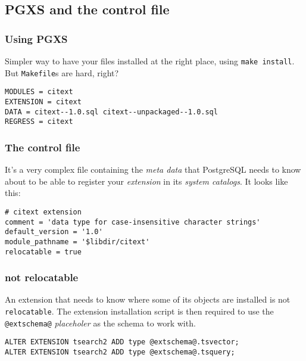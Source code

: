 \documentclass[english]{beamer}
\begin{document}
\subsection{PGXS and the control file}

\begin{frame}[fragile]
  \frametitle{Using PGXS}

  Simpler way to have your files installed at the right place, using
  \texttt{make install}. But \texttt{Makefile}s are hard, right?
  \linebreak

  \begin{example}
\begin{verbatim}
MODULES = citext
EXTENSION = citext
DATA = citext--1.0.sql citext--unpackaged--1.0.sql
REGRESS = citext
\end{verbatim}
  \end{example}
\end{frame}

\begin{frame}[fragile]
  \frametitle{The control file}

  It's a very complex file containing the \textit{meta data} that PostgreSQL
  needs to know about to be able to register your \textit{extension} in its
  \textit{system catalogs}. It looks like this:
  \linebreak

  \begin{example}
\begin{verbatim}
# citext extension
comment = 'data type for case-insensitive character strings'
default_version = '1.0'
module_pathname = '$libdir/citext'
relocatable = true
\end{verbatim}
  \end{example}
\end{frame}


\begin{frame}[fragile]
  \frametitle{not relocatable}

  An extension that needs to know where some of its objects are installed is
  not \texttt{relocatable}.  The extension installation script is then
  required to use the \texttt{@extschema@} \textit{placeholer} as the schema
  to work with.

  \begin{example}
\begin{verbatim}
ALTER EXTENSION tsearch2 ADD type @extschema@.tsvector;
ALTER EXTENSION tsearch2 ADD type @extschema@.tsquery;
\end{verbatim}
  \end{example}
\end{frame}
\end{document}
